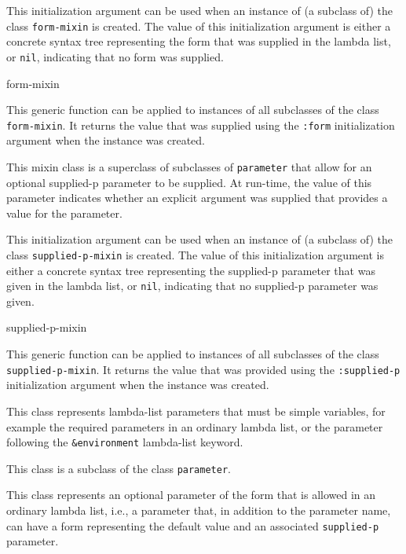 
This initialization argument can be used when an instance of
(a subclass of) the class \texttt{form-mixin} is created.  The value
of this initialization argument is either a concrete syntax tree
representing the form that was supplied in the lambda list, or
\texttt{nil}, indicating that no form was supplied.

 {form-mixin}

This generic function can be applied to instances of all subclasses of
the class \texttt{form-mixin}.  It returns the value that was supplied
using the \texttt{:form} initialization argument when the instance was
created.


This mixin class is a superclass of subclasses of \texttt{parameter}
that allow for an optional supplied-p parameter to be supplied.  At
run-time, the value of this parameter indicates whether an explicit
argument was supplied that provides a value for the parameter.


This initialization argument can be used when an instance of (a
subclass of) the class \texttt{supplied-p-mixin} is created.  The
value of this initialization argument is either a concrete syntax tree
representing the supplied-p parameter that was given in the lambda
list, or \texttt{nil}, indicating that no supplied-p parameter was
given.

 {supplied-p-mixin}

This generic function can be applied to instances of all subclasses of
the class \texttt{supplied-p-mixin}.  It returns the value that was provided
using the \texttt{:supplied-p} initialization argument when the instance was
created.


This class represents lambda-list parameters that must be simple
variables, for example the required parameters in an ordinary lambda
list, or the parameter following the \texttt{\&environment}
lambda-list keyword.

This class is a subclass of the class \texttt{parameter}.


This class represents an optional parameter of the form that is
allowed in an ordinary lambda list, i.e., a parameter that, in
addition to the parameter name, can have a form representing the
default value and an associated \texttt{supplied-p} parameter.

